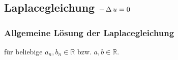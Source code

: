 \documentclass[german,color,5pt]{latex4ei/latex4ei_fs}
\begin{document}
\begin{sectionbox}
	\subsection{Laplacegleichung $-\operatorname{\Delta} u=0$}
	\subsubsection{Allgemeine Lösung der Laplacegleichung}
	für beliebige $a_{n},b_{n} \in \mathbb{R}$ bzw. $a,b \in \mathbb{R}$.

\end{sectionbox}
\end{document}
